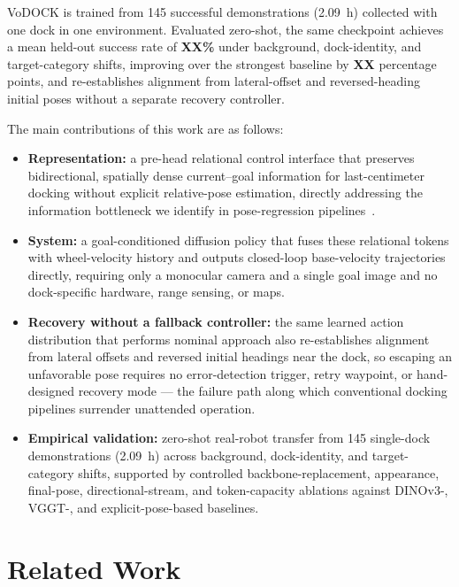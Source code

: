 \documentclass[letterpaper, 10 pt, conference]{IEEEtran}  %
\begin{document}
VoDOCK is trained from 145 successful demonstrations (2.09~h) collected with one dock in one environment. Evaluated zero-shot, the same checkpoint achieves a mean held-out success rate of \textbf{XX\%} under background, dock-identity, and target-category shifts, improving over the strongest baseline by \textbf{XX} percentage points, and re-establishes alignment from lateral-offset and reversed-heading initial poses without a separate recovery controller.

The main contributions of this work are as follows:
\begin{itemize}
\item \textbf{Representation:} a pre-head relational control interface that preserves bidirectional, spatially dense current--goal information for last-centimeter docking without explicit relative-pose estimation, directly addressing the information bottleneck we identify in pose-regression pipelines~\cite{c4,vggt2025,jantos2025aleatoric}.
\item \textbf{System:} a goal-conditioned diffusion policy that fuses these relational tokens with wheel-velocity history and outputs closed-loop base-velocity trajectories directly, requiring only a monocular camera and a single goal image and no dock-specific hardware, range sensing, or maps.
\item \textbf{Recovery without a fallback controller:} the same learned action distribution that performs nominal approach also re-establishes alignment from lateral offsets and reversed initial headings near the dock, so escaping an unfavorable pose requires no error-detection trigger, retry waypoint, or hand-designed recovery mode --- the failure path along which conventional docking pipelines surrender unattended operation.
\item \textbf{Empirical validation:} zero-shot real-robot transfer from 145 single-dock demonstrations (2.09~h) across background, dock-identity, and target-category shifts, supported by controlled backbone-replacement, appearance, final-pose, directional-stream, and token-capacity ablations against DINOv3-, VGGT-, and explicit-pose-based baselines.
\end{itemize}


\section{Related Work}
\label{sec:related_work}
\end{document}
